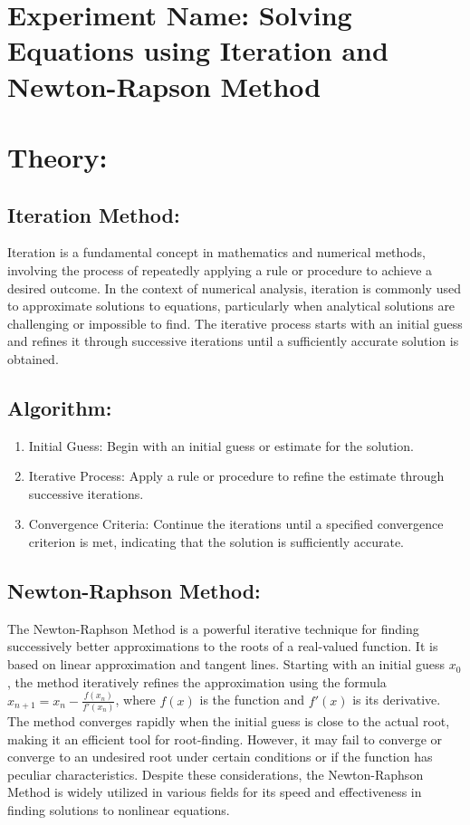 \documentclass[a4paper,12pt]{report}
\begin{document}
\section*{Experiment Name: \small Solving Equations using Iteration and Newton-Rapson Method}
\section*{Theory:}

\subsection*{Iteration Method:}
\qquad Iteration is a fundamental concept in mathematics and numerical methods, involving the process of repeatedly applying a rule or procedure to achieve a desired outcome. In the context of numerical analysis, iteration is commonly used to approximate solutions to equations, particularly when analytical solutions are challenging or impossible to find. The iterative process starts with an initial guess and refines it through successive iterations until a sufficiently accurate solution is obtained.

\subsection*{Algorithm:}
\begin{enumerate}
    \item Initial Guess: Begin with an initial guess or estimate for the solution.
    \item Iterative Process: Apply a rule or procedure to refine the estimate through successive iterations.
    \item Convergence Criteria: Continue the iterations until a specified convergence criterion is met, indicating that the solution is sufficiently accurate.
\end{enumerate}

\subsection*{Newton-Raphson Method:}
\qquad The Newton-Raphson Method is a powerful iterative technique for finding successively better approximations to the roots of a real-valued function. It is based on linear approximation and tangent lines. Starting with an initial guess \(x_0\), the method iteratively refines the approximation using the formula \(x_{n+1} = x_n - \frac{f(x_n)}{f'(x_n)}\), where \(f(x)\) is the function and \(f'(x)\) is its derivative. The method converges rapidly when the initial guess is close to the actual root, making it an efficient tool for root-finding. However, it may fail to converge or converge to an undesired root under certain conditions or if the function has peculiar characteristics. Despite these considerations, the Newton-Raphson Method is widely utilized in various fields for its speed and effectiveness in finding solutions to nonlinear equations.
\end{document}
